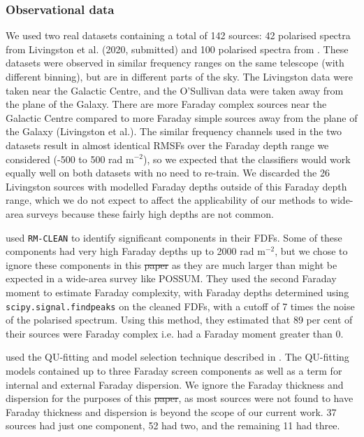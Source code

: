 \documentclass[11pt, a4paper]{book}
\providecommand{\DIFaddtex}[1]{{\protect\color{blue}\uwave{#1}}} %
\providecommand{\DIFdeltex}[1]{{\protect\color{red}\sout{#1}}}                      %
\providecommand{\DIFaddbegin}{} %
\providecommand{\DIFaddend}{} %
\providecommand{\DIFdelbegin}{} %
\providecommand{\DIFdelend}{} %
\providecommand{\DIFadd}[1]{\texorpdfstring{\DIFaddtex{#1}}{#1}} %
\providecommand{\DIFdel}[1]{\texorpdfstring{\DIFdeltex{#1}}{}} %
\newcommand{\DIFscaledelfig}{0.5}
\newlength{\DIFdelgraphicswidth} %
\newlength{\DIFdelgraphicsheight} %
\newcommand{\DIFaddincludegraphics}[2][]{{\color{blue}\fbox{\DIFOincludegraphics[#1]{#2}}}} %
\newcommand{\DIFdelincludegraphics}[2][]{%
\sbox{\DIFdelgraphicsbox}{\DIFOincludegraphics[#1]{#2}}%
\settoboxwidth{\DIFdelgraphicswidth}{\DIFdelgraphicsbox} %
\settoboxtotalheight{\DIFdelgraphicsheight}{\DIFdelgraphicsbox} %
\scalebox{\DIFscaledelfig}{%
\parbox[b]{\DIFdelgraphicswidth}{\usebox{\DIFdelgraphicsbox}\\[-\baselineskip] \rule{\DIFdelgraphicswidth}{0em}}\llap{\resizebox{\DIFdelgraphicswidth}{\DIFdelgraphicsheight}{%
\setlength{\unitlength}{\DIFdelgraphicswidth}%
\begin{picture}(1,1)%
\thicklines\linethickness{2pt} %
{\color[rgb]{1,0,0}\put(0,0){\framebox(1,1){}}}%
{\color[rgb]{1,0,0}\put(0,0){\line( 1,1){1}}}%
{\color[rgb]{1,0,0}\put(0,1){\line(1,-1){1}}}%
\end{picture}%
}\hspace*{3pt}}} %
} %
\DeclareRobustCommand{\DIFaddbegin}{\DIFOaddbegin \let\includegraphics\DIFaddincludegraphics} %
\DeclareRobustCommand{\DIFaddend}{\DIFOaddend \let\includegraphics\DIFOincludegraphics} %
\DeclareRobustCommand{\DIFdelbegin}{\DIFOdelbegin \let\includegraphics\DIFdelincludegraphics} %
\DeclareRobustCommand{\DIFdelend}{\DIFOaddend \let\includegraphics\DIFOincludegraphics} %
\begin{document}
  \subsubsection{Observational data}
  \label{sec:faraday-observational-data}

    We used two real datasets containing a total of 142 sources: 42 polarised spectra from Livingston et al. (2020, submitted) and 100 polarised spectra from \citet{osullivan_broad-band_2017}. These datasets were observed in similar frequency ranges on the same telescope (with different binning), but are in different parts of the sky. The Livingston data were taken near the Galactic Centre, and the O'Sullivan data were taken away from the plane of the Galaxy. There are more Faraday complex sources near the Galactic Centre compared to more Faraday simple sources away from the plane of the Galaxy (Livingston et al.). The similar frequency channels used in the two datasets result in almost identical RMSFs over the Faraday depth range we considered (-500 to 500 rad m$^{-2}$), so we expected that the classifiers would work equally well on both datasets with no need to re-train. We discarded the 26 Livingston sources with modelled Faraday depths outside of this Faraday depth range, which we do not expect to affect the applicability of our methods to wide-area surveys because these fairly high depths are not common.

    \citet{livingston21faraday} used \texttt{RM-CLEAN} \citep{heald09faraday} to identify significant components in their FDFs. Some of these components had very high Faraday depths up to 2000 rad m$^{-2}$, but we chose to ignore these components in this \DIFdelbegin \DIFdel{paper }\DIFdelend \DIFaddbegin \DIFadd{chapter }\DIFaddend as they are much larger than might be expected in a wide-area survey like POSSUM. They used the second Faraday moment \citep{brown11report} to estimate Faraday complexity, with Faraday depths determined using \texttt{scipy.signal.find\textunderscore{}peaks} on the cleaned FDFs, with a cutoff of 7 times the noise of the polarised spectrum. Using this method, they estimated that 89 per cent of their sources were Faraday complex i.e. had a Faraday moment greater than 0.

    \citet{osullivan_broad-band_2017} used the QU-fitting and model selection technique described in \citet{osullivan12agn}. The QU-fitting models contained up to three Faraday screen components as well as a term for internal and external Faraday dispersion. We ignore the Faraday thickness and dispersion for the purposes of this \DIFdelbegin \DIFdel{paper}\DIFdelend \DIFaddbegin \DIFadd{chapter}\DIFaddend , as most sources were not found to have Faraday thickness and dispersion is beyond the scope of our current work. 37 sources had just one component, 52 had two, and the remaining 11 had three.
\end{document}
